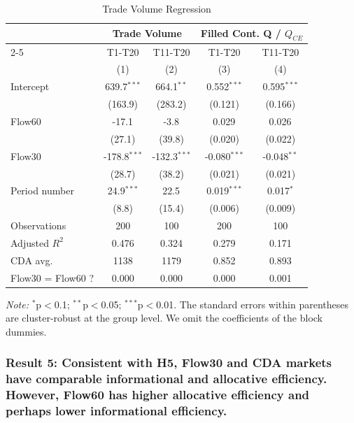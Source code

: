 \documentclass[12pt]{article}
\begin{document}
\begin{table}
\centering    
\caption{Trade Volume Regression}
\begin{threeparttable}
\begin{tabular}{@{\extracolsep{5pt}}lcccc}
\toprule
& \multicolumn{2}{c}{Trade Volume} & \multicolumn{2}{c}{Filled Cont. Q / $Q_{CE}$} \\
\cmidrule{2-5}
& T1-T20 & T11-T20 & T1-T20 & T11-T20 \\
& (1) & (2) & (3) & (4) \\
\midrule
Intercept & 639.7$^{***}$ & 664.1$^{**}$ & 0.552$^{***}$ & 0.595$^{***}$ \\
  & (163.9) & (283.2) & (0.121) & (0.166) \\
Flow60 & -17.1$^{}$ & -3.8$^{}$ & 0.029$^{}$ & 0.026$^{}$ \\
  & (27.1) & (39.8) & (0.020) & (0.022) \\
Flow30 & -178.8$^{***}$ & -132.3$^{***}$ & -0.080$^{***}$ & -0.048$^{**}$ \\
  & (28.7) & (38.2) & (0.021) & (0.021) \\
Period number & 24.9$^{***}$ & 22.5$^{}$ & 0.019$^{***}$ & 0.017$^{*}$ \\
  & (8.8) & (15.4) & (0.006) & (0.009) \\
\midrule
Observations & 200 & 100 & 200 & 100 \\
Adjusted $R^2$ & 0.476 & 0.324 & 0.279 & 0.171 \\
\midrule
CDA avg. & 1138 & 1179 & 0.852 & 0.893 \\
Flow30 = Flow60 ? & 0.000 & 0.000 & 0.000 & 0.001 \\
\bottomrule
\end{tabular}
\begin{tablenotes}[para]
\footnotesize
\textit{Note:} $^{*}$p$<$0.1; $^{**}$p$<$0.05; $^{***}$p$<$0.01. The standard errors within parentheses are cluster-robust at the group level. We omit the coefficients of the block dummies. 
\end{tablenotes}
\end{threeparttable}
\label{tab:Volume}
\end{table}

\subsubsection*{Result 5: Consistent with H5, Flow30 and CDA markets have comparable  informational and allocative efficiency. However, Flow60 has higher allocative efficiency and perhaps lower informational efficiency.}
\end{document}
